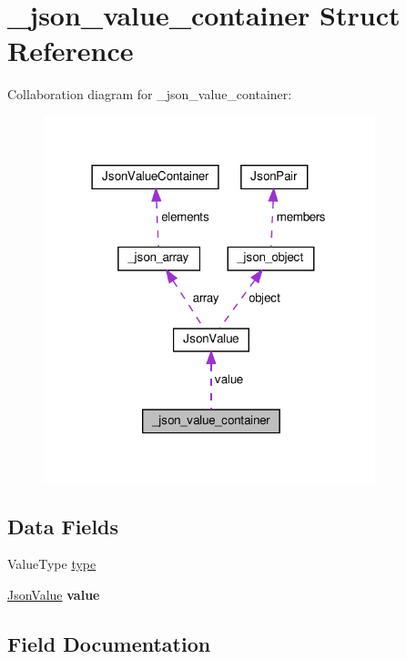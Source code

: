 \hypertarget{struct__json__value__container}{}\section{\+\_\+json\+\_\+value\+\_\+container Struct Reference}
\label{struct__json__value__container}


Collaboration diagram for \+\_\+json\+\_\+value\+\_\+container\+:\nopagebreak
\begin{figure}[H]
\begin{center}
\leavevmode
\includegraphics[width=273pt]{struct__json__value__container__coll__graph}
\end{center}
\end{figure}
\subsection*{Data Fields}
\begin{DoxyCompactItemize}
\item 
Value\+Type \hyperlink{struct__json__value__container_a21cdc2a7c5df1f10e0b61ee6f99c3bcc}{type}
\item 
\mbox{\label{struct__json__value__container_a73ad9502b6b086e7429f69817bc7ba4b}} 
\hyperlink{unionJsonValue}{Json\+Value} {\bfseries value}
\end{DoxyCompactItemize}


\subsection{Field Documentation}
\mbox{\label{struct__json__value__container_a21cdc2a7c5df1f10e0b61ee6f99c3bcc}} 
